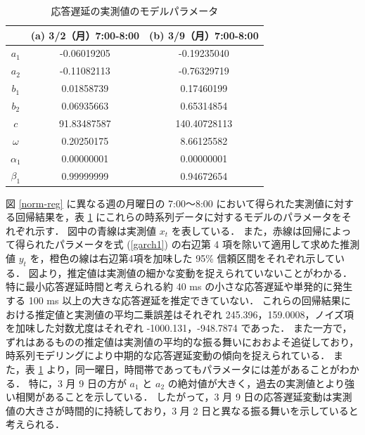 \documentclass[technicalreport]{ieicej}
\begin{document}
\begin{table}[tb]
\centering
\caption{応答遅延の実測値のモデルパラメータ}
\label{norm-param}
\begin{tabular}{|c|c|c|}
\hline
&(a) 3/2（月）7:00-8:00&(b) 3/9（月）7:00-8:00\\
\hline
$a_1$&-0.06019205&-0.19235040\\
\hline
$a_2$&-0.11082113&-0.76329719\\
\hline
$b_1$&0.01858739&0.17460199\\
\hline
$b_2$&0.06935663&0.65314854\\
\hline
$c$&91.83487587&140.40728113\\
\hline
$\omega$&0.20250175&8.66125582\\
\hline
$\alpha_1$&0.00000001&0.00000001\\
\hline
$\beta_1$&0.99999999&0.94672654\\
\hline
\end{tabular}
\end{table}

図 \ref{norm-reg} に異なる週の月曜日の 7:00～8:00 において得られた実測値に対する回帰結果を，表 \ref{norm-param} にこれらの時系列データに対するモデルのパラメータをそれぞれ示す．
図中の青線は実測値 $x_t$ を表している．
また，赤線は回帰によって得られたパラメータを式 (\ref{garch1}) の右辺第 4 項を除いて適用して求めた推測値 $y_t$ を，橙色の線は右辺第4項を加味した 95\% 信頼区間をそれぞれ示している．
図より，推定値は実測値の細かな変動を捉えられていないことがわかる．
特に最小応答遅延時間と考えられる約 40 ms の小さな応答遅延や単発的に発生する 100 ms 以上の大きな応答遅延を推定できていない．
これらの回帰結果における推定値と実測値の平均二乗誤差はそれぞれ 245.396，159.0008，ノイズ項を加味した対数尤度はそれぞれ -1000.131，-948.7874 であった．
また一方で，ずれはあるものの推定値は実測値の平均的な振る舞いにおおよそ追従しており，時系列モデリングにより中期的な応答遅延変動の傾向を捉えられている．
また，表 \ref{norm-param} より，同一曜日，時間帯であってもパラメータには差があることがわかる．
特に，3 月 9 日の方が $a_1$ と $a_2$ の絶対値が大きく，過去の実測値とより強い相関があることを示している．
したがって，3 月 9 日の応答遅延変動は実測値の大きさが時間的に持続しており，3 月 2 日と異なる振る舞いを示していると考えられる．
\end{document}
